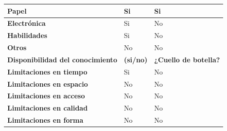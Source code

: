 \documentclass[a4paper,11pt]{article}
\begin{document}
\begin{center}
\begin{tabular}{| p{6.3cm} | l | p{3.8cm} |}
					\hline
					\textbf{Papel} & Si & Si\\
					\hline
					\textbf{Electrónica} & Si & No\\
					\hline
					\textbf{Habilidades} & Si & No\\
					\hline
					\textbf{Otros} & No & No\\
					\hline
					\textbf{Disponibilidad del conocimiento} & \textbf{(si/no)} & \textbf{¿Cuello
					de botella?}\\
					\hline
					\textbf{Limitaciones en tiempo} & Si & No\\
					\hline
					\textbf{Limitaciones en espacio} & No & No\\
					\hline
					\textbf{Limitaciones en acceso} & No & No\\
					\hline
					\textbf{Limitaciones en calidad} & No & No\\
					\hline
					\textbf{Limitaciones en forma} & No & No\\
					\hline
				\end{tabular}
			\end{center}
			\newpage
\end{document}
